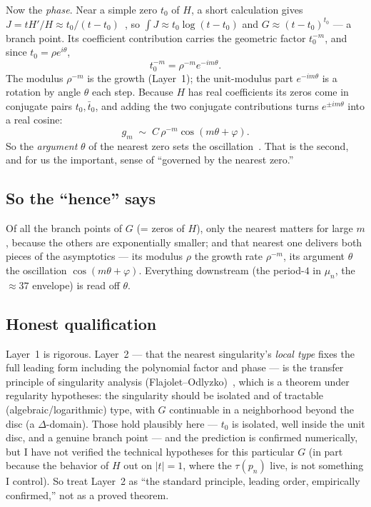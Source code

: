 \documentclass[11pt]{amsart}
\begin{document}
Now the \emph{phase}. Near a simple zero $t_0$ of $H$, a short calculation gives
$J=tH'/H\approx t_0/(t-t_0)$~\cite{Ahlfors}, so $\int J\approx t_0\log(t-t_0)$ and
$G\approx(t-t_0)^{t_0}$ --- a branch point. Its coefficient contribution carries the
geometric factor $t_0^{-m}$, and since $t_0=\rho e^{i\theta}$,
\[
t_0^{-m}=\rho^{-m}e^{-im\theta}.
\]
The modulus $\rho^{-m}$ is the growth (Layer~1); the unit-modulus part $e^{-im\theta}$ is a
rotation by angle $\theta$ each step. Because $H$ has real coefficients its zeros come in
conjugate pairs $t_0,\bar t_0$, and adding the two conjugate contributions turns
$e^{\pm im\theta}$ into a real cosine:
\[
g_m\;\sim\;C\,\rho^{-m}\cos(m\theta+\varphi).
\]
So the \emph{argument} $\theta$ of the nearest zero sets the
oscillation~\cite{Odlyzko1982,FlajoletSedgewick2009}. That is the second, and for us the
important, sense of ``governed by the nearest zero.''

\subsection*{So the ``hence'' says}
Of all the branch points of $G$ (= zeros of $H$), only the nearest matters for large $m$,
because the others are exponentially smaller; and that nearest one delivers both pieces of
the asymptotics --- its modulus $\rho$ the growth rate $\rho^{-m}$, its argument $\theta$ the
oscillation $\cos(m\theta+\varphi)$. Everything downstream (the period-$4$ in $\mu_n$, the
$\approx37$ envelope) is read off $\theta$.

\subsection*{Honest qualification}
Layer~1 is rigorous. Layer~2 --- that the nearest singularity's \emph{local type} fixes the
full leading form including the polynomial factor and phase --- is the transfer principle of
singularity analysis (Flajolet--Odlyzko)~\cite{FlajoletOdlyzko1990,FlajoletSedgewick2009},
which is a theorem under regularity hypotheses: the singularity should be isolated and of
tractable (algebraic/logarithmic) type, with $G$ continuable in a neighborhood beyond the
disc (a $\Delta$-domain). Those hold plausibly here --- $t_0$ is isolated, well inside the
unit disc, and a genuine branch point --- and the prediction is confirmed numerically, but I
have not verified the technical hypotheses for this particular $G$ (in part because the
behavior of $H$ out on $|t|=1$, where the $\tau(p_n)$ live, is not something I control). So
treat Layer~2 as ``the standard principle, leading order, empirically confirmed,'' not as a
proved theorem.
\end{document}
